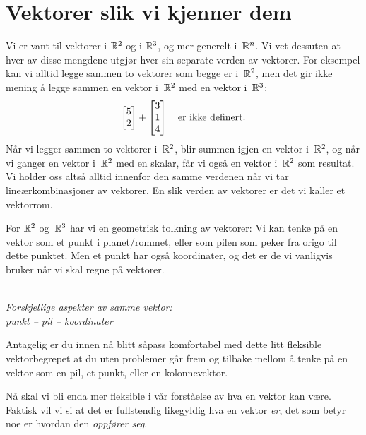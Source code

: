 \section*{Vektorer slik vi kjenner dem}

Vi er vant til vektorer i $\mathbb{R}^2$ og i $\mathbb{R}^3$, og mer generelt
i~$\mathbb{R}^n$.  Vi vet dessuten at hver av disse mengdene utgjør hver sin
separate verden av vektorer.  For eksempel kan vi alltid legge sammen
to vektorer som begge er i~$\mathbb{R}^2$, men det gir ikke mening å legge
sammen en vektor i~$\mathbb{R}^2$ med en vektor i~$\mathbb{R}^3$:
\[
\begin{bmatrix} 5 \\ 2 \end{bmatrix} + \begin{bmatrix} 3 \\ 1 \\ 4 \end{bmatrix}
\quad\text{er ikke definert.}
\]
Når vi legger sammen to vektorer i~$\mathbb{R}^2$, blir summen igjen en vektor
i~$\mathbb{R}^2$, og når vi ganger en vektor i~$\mathbb{R}^2$ med en skalar, får vi
også en vektor i~$\mathbb{R}^2$ som resultat.  Vi holder oss altså alltid
innenfor den samme verdenen når vi tar lineærkombinasjoner av
vektorer.  En slik verden av vektorer er det vi kaller et vektorrom.

\smallskip
For $\mathbb{R}^2$ og~$\mathbb{R}^3$ har vi en geometrisk tolkning av
vektorer: Vi kan tenke på en vektor som et punkt i planet/rommet,
eller som pilen som peker fra origo til dette punktet.  Men et punkt
har også koordinater, og det er de vi vanligvis bruker når vi skal
regne på vektorer.

\begin{center}
\\
{\small \textit{Forskjellige aspekter av samme vektor:\\punkt -- pil -- koordinater}}
\end{center}

Antagelig er du innen nå blitt såpass komfortabel med dette litt
fleksible vektorbegrepet at du uten problemer går frem og tilbake
mellom å tenke på en vektor som en pil, et punkt, eller en
kolonnevektor.

Nå skal vi bli enda mer fleksible i vår forståelse av hva en vektor
kan være.  Faktisk vil vi si at det er fullstendig likegyldig hva en
vektor \emph{er}, det som betyr noe er hvordan den \emph{oppfører
  seg}.

